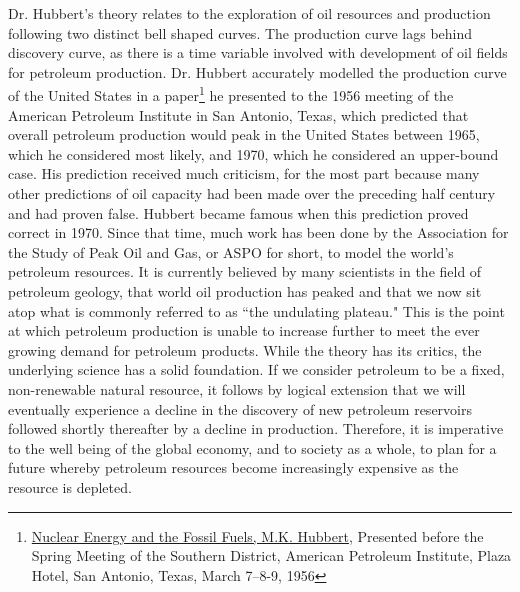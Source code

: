 \documentclass[letterpaper,10pt,twoside]{article}
\begin{document}
Dr. Hubbert's theory relates to the exploration of oil resources and production following two distinct bell shaped curves.  The production curve lags behind discovery curve, as there is a time variable involved with development of oil fields for petroleum production.  Dr. Hubbert accurately modelled the production curve of the United States in a paper\footnote{\href{http://www.hubbertpeak.com/hubbert/1956/1956.pdf}{Nuclear Energy and the Fossil Fuels, M.K. Hubbert}, Presented before the Spring Meeting of the Southern District, American Petroleum Institute, Plaza Hotel, San Antonio, Texas, March 7–8-9, 1956} he presented to the 1956 meeting of the American Petroleum Institute in San Antonio, Texas, which predicted that overall petroleum production would peak in the United States between 1965, which he considered most likely, and 1970, which he considered an upper-bound case.  His prediction received much criticism, for the most part because many other predictions of oil capacity had been made over the preceding half century and had proven false.  Hubbert became famous when this prediction proved correct in 1970.  Since that time, much work has been done by the Association for the Study of Peak Oil and Gas, or ASPO for short, to model the world's petroleum resources.  It is currently believed by many scientists in the field of petroleum geology, that world oil production has peaked and that we now sit atop what is commonly referred to as ``the undulating plateau."  This is the point at which petroleum production is unable to increase further to meet the ever growing demand for petroleum products.  While the theory has its critics, the underlying science has a solid foundation.  If we consider petroleum to be a fixed, non-renewable natural resource, it follows by logical extension that we will eventually experience a decline in the discovery of new petroleum reservoirs followed shortly thereafter by a decline in production.  Therefore, it is imperative to the well being of the global economy, and to society as a whole, to plan for a future whereby petroleum resources become increasingly expensive as the resource is depleted.
\end{document}
